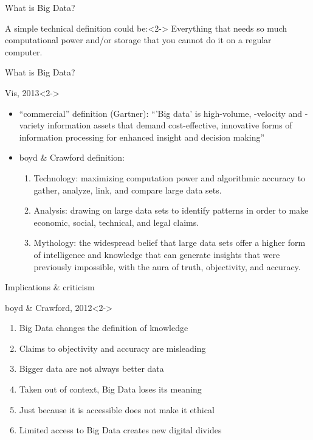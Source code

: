 \documentclass{beamer}
\begin{document}

\begin{frame}{What is Big Data?}
\begin{block}{A simple technical definition could be:}<2->
Everything that needs so much computational power and/or storage that you cannot do it on a regular computer.
\end{block}
\end{frame}

\begin{frame}{What is Big Data?}
\begin{block}{Vis, 2013}<2->
\begin{itemize}
\item<2,4> ``commercial'' definition (Gartner): ``'Big data' is high-volume, -velocity and -variety information assets that demand cost-effective, innovative forms of information processing for enhanced insight and decision making''
\item<3-> boyd \& Crawford definition: 
\begin{enumerate}
\item Technology: maximizing computation power and algorithmic accuracy to gather, analyze, link, and compare large data sets.
\item Analysis: drawing on large data sets to identify patterns in order to make economic, social, technical, and legal claims.
\item Mythology: the widespread belief that large data sets offer a higher form of intelligence and knowledge that can generate insights that were previously impossible, with the aura of truth, objectivity, and accuracy.
\end{enumerate}
\end{itemize}
\end{block}
\end{frame}


\begin{frame}{Implications \& criticism}
\begin{block}{boyd \& Crawford, 2012}<2->
\begin{enumerate}
\item Big Data changes the definition of knowledge
\item Claims to objectivity and accuracy are misleading
\item Bigger data are not always better data
\item Taken out of context, Big Data loses its meaning
\item Just because it is accessible does not make it ethical
\item Limited access to Big Data creates new digital divides
\end{enumerate}
\end{block}
\end{frame}
\end{document}
